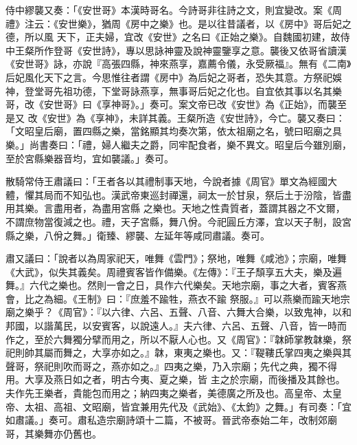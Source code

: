 \begin{pinyinscope}
 侍中繆襲又奏：「《安世哥》本漢時哥名。今詩哥非往詩之文，則宜變改。案《周禮》注云：《安世樂》，猶周《房中之樂》也。是以往昔議者，以《房中》哥后妃之德，所以風
 天下，正夫婦，宜改《安世》之名曰《正始之樂》。自魏國初建，故侍中王粲所作登哥《安世詩》，專以思詠神靈及說神靈鑒享之意。襲後又依哥省讀漢《安世哥》詠，亦說『高張四縣，神來燕享，嘉薦令儀，永受厥福』。無有《二南》后妃風化天下之言。今思惟往者謂《房中》為后妃之哥者，恐失其意。方祭祀娛神，登堂哥先祖功德，下堂哥詠燕享，無事哥后妃之化也。自宜依其事以名其樂哥，改《安世哥》曰《享神哥》。」奏可。案文帝已改《安世》為《正始》，而襲至是又
 改《安世》為《享神》，未詳其義。王粲所造《安世詩》，今亡。襲又奏曰：「文昭皇后廟，置四縣之樂，當銘顯其均奏次第，依太祖廟之名，號曰昭廟之具樂。」尚書奏曰：「禮，婦人繼夫之爵，同牢配食者，樂不異文。昭皇后今雖別廟，至於宮縣樂器音均，宜如襲議。」奏可。



 散騎常侍王肅議曰：「王者各以其禮制事天地，今說者據《周官》單文為經國大體，懼其局而不知弘也。漢武帝東巡封禪還，祠太一於甘泉，祭后土于汾陰，皆盡用其樂。言盡用者，為盡用宮縣
 之樂也。天地之性貴質者，蓋謂其器之不文爾，不謂庶物當復減之也。禮，天子宮縣，舞八佾。今祀圓丘方澤，宜以天子制，設宮縣之樂，八佾之舞。」衛臻、繆襲、左延年等咸同肅議。奏可。



 肅又議曰：「說者以為周家祀天，唯舞《雲門》；祭地，唯舞《咸池》；宗廟，唯舞《大武》，似失其義矣。周禮賓客皆作備樂。《左傳》：『王子頹享五大夫，樂及遍舞。』六代之樂也。然則一會之日，具作六代樂矣。天地宗廟，事之大者，賓客燕會，比之為細。《王制》曰：『庶羞不踰牲，燕衣不踰
 祭服。』可以燕樂而踰天地宗廟之樂乎？《周官》：『以六律、六呂、五聲、八音、六舞大合樂，以致鬼神，以和邦國，以諧萬民，以安賓客，以說遠人。』夫六律、六呂、五聲、八音，皆一時而作之，至於六舞獨分擘而用之，所以不厭人心也。又《周官》：『韎師掌教韎樂，祭祀則帥其屬而舞之，大享亦如之。』韎，東夷之樂也。又：『鞮鞻氏掌四夷之樂與其聲哥，祭祀則吹而哥之，燕亦如之。』四夷之樂，乃入宗廟；先代之典，獨不得用。大享及燕日如之者，明古今夷、夏之樂，皆
 主之於宗廟，而後播及其餘也。夫作先王樂者，貴能包而用之；納四夷之樂者，美德廣之所及也。高皇帝、太皇帝、太祖、高祖、文昭廟，皆宜兼用先代及《武始》、《太鈞》之舞。」有司奏：「宜如肅議。」奏可。肅私造宗廟詩頌十二篇，不被哥。晉武帝泰始二年，改制郊廟哥，其樂舞亦仍舊也。




\end{pinyinscope}
